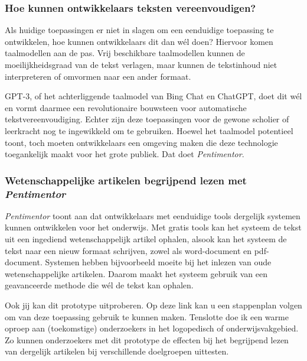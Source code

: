 \documentclass[a4paper,9pt,twoside]{report}
\begin{document}
\subsubsection{Hoe kunnen ontwikkelaars teksten vereenvoudigen?}

\noindent Als huidige toepassingen er niet in slagen om een eenduidige toepassing te ontwikkelen, hoe kunnen ontwikkelaars dit dan wél doen? Hiervoor komen taalmodellen aan de pas. Vrij beschikbare taalmodellen kunnen de moeilijkheidsgraad van de tekst verlagen, maar kunnen de tekstinhoud niet interpreteren of omvormen naar een ander formaat. 

\medspace

\noindent GPT-3, of het achterliggende taalmodel van Bing Chat en ChatGPT, doet dit wél en vormt daarmee een revolutionaire bouwsteen voor automatische tekstvereenvoudiging. Echter zijn deze toepassingen voor de gewone scholier of leerkracht nog te ingewikkeld om te gebruiken. Hoewel het taalmodel potentieel toont, toch moeten ontwikkelaars een omgeving maken die deze technologie toegankelijk maakt voor het grote publiek. Dat doet \textit{Pentimentor}.

\subsubsection{Wetenschappelijke artikelen begrijpend lezen met \textit{Pentimentor}}

\noindent \textit{Pentimentor} toont aan dat ontwikkelaars met eenduidige tools dergelijk systemen kunnen ontwikkelen voor het onderwijs. Met gratis tools kan het systeem de tekst uit een ingediend wetenschappelijk artikel ophalen, alsook kan het systeem de tekst naar een nieuw formaat schrijven, zowel als word-document en pdf-document. Systemen hebben bijvoorbeeld moeite bij het inlezen van oude wetenschappelijke artikelen. Daarom maakt het systeem gebruik van een geavanceerde methode die wél de tekst kan ophalen.

\medspace



\medspace

\noindent Ook jij kan dit prototype uitproberen. Op deze link kan u een stappenplan volgen om van deze toepassing gebruik te kunnen maken. Tenslotte doe ik een warme oproep aan (toekomstige) onderzoekers in het logopedisch of onderwijsvakgebied. Zo kunnen onderzoekers met dit prototype de effecten bij het begrijpend lezen van dergelijk artikelen bij verschillende doelgroepen uittesten.
\end{document}
